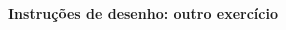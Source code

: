 \documentclass[oneside,12pt]{article}
\begin{document}
\newpage

%

\def\IT{\ga{instrthin}}
\def\ITS{\IT & \IT & \IT & \IT & \IT & \IT & \IT & \IT & \IT }

$\scalebox{0.6}{$
 \begin{matrix}
 \ITS \\
 \ITS \\
 \ITS \\
 \ITS \\
 \ITS \\
 \ITS \\
 \ITS \\
 \ITS \\
 \ITS \\
 \end{matrix}
 $}
$


\newpage


{\bf Instruções de desenho: outro exercício}
\end{document}
